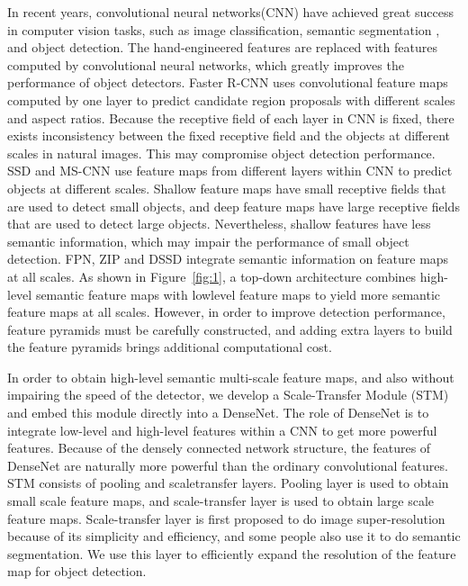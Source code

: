 \documentclass[10pt,twocolumn,letterpaper]{article}
\begin{document}
In recent years, convolutional neural networks(CNN) have achieved great success in computer vision tasks,
such as image classification\cite{Krizhevsky2012ImageNet}, semantic segmentation
\cite{Long2015Fully}, and object detection. The hand-engineered features
are replaced with features computed by convolutional
neural networks, which greatly improves the performance
of object detectors. Faster R-CNN uses convolutional
feature maps computed by one layer to predict candidate region
proposals with different scales and aspect ratios. Because the receptive field of each layer in CNN
is fixed, there exists inconsistency between the fixed receptive
field and the objects at different scales in natural images.
This may compromise object detection performance.
SSD and MS-CNN use feature maps from different layers within CNN to predict objects at different scales. Shallow feature maps have small receptive
fields that are used to detect small objects, and deep
feature maps have large receptive fields that are used to
detect large objects. Nevertheless, shallow features have
less semantic information, which may impair the performance
of small object detection. FPN, ZIP and
DSSD integrate semantic information on feature maps
at all scales. As shown in Figure~\ref{fig:1}, a top-down architecture
combines high-level semantic feature maps with lowlevel
feature maps to yield more semantic feature maps at
all scales. However, in order to improve detection performance,
feature pyramids must be carefully constructed, and
adding extra layers to build the feature pyramids brings additional
computational cost.

In order to obtain high-level semantic multi-scale feature
maps, and also without impairing the speed of the detector,
we develop a Scale-Transfer Module (STM) and embed
this module directly into a DenseNet\cite{Huang2017Densely}. The role
of DenseNet is to integrate low-level and high-level features
within a CNN to get more powerful features. Because
of the densely connected network structure, the features of DenseNet are naturally more powerful than the ordinary
convolutional features. STM consists of pooling and scaletransfer
layers. Pooling layer is used to obtain small scale
feature maps, and scale-transfer layer is used to obtain large
scale feature maps. Scale-transfer layer is first proposed to
do image super-resolution because of its simplicity and
efficiency, and some people also use it to do semantic segmentation. We use this layer to efficiently expand the
resolution of the feature map for object detection.
\end{document}
